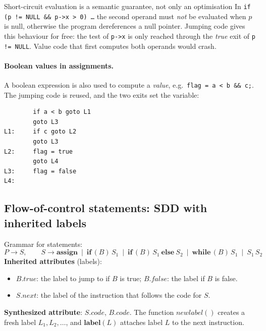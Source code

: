 \documentclass[11pt,a4paper]{article}
\newcommand{\at}[2]{\ensuremath{#1.\mathit{#2}}}
\newcommand{\lbl}[1]{\ensuremath{\mathbf{label}(#1)}}
\begin{document}
\begin{pitfallbox}{Short-circuit evaluation is a semantic guarantee, not only an optimisation}
In \texttt{if (p != NULL \&\& p->x > 0) \dots} the second operand must \emph{not} be evaluated when $p$ is null, otherwise the program dereferences a null pointer. Jumping code gives this behaviour for free: the test of \texttt{p->x} is only reached through the \emph{true} exit of \texttt{p != NULL}. Value code that first computes both operands would crash.
\end{pitfallbox}

\paragraph{Boolean values in assignments.} A boolean expression is also used to compute a \emph{value}, e.g.\ \texttt{flag = a < b \&\& c;}. The jumping code is reused, and the two exits set the variable:
\begin{lstlisting}
        if a < b goto L1
        goto L3
L1:     if c goto L2
        goto L3
L2:     flag = true
        goto L4
L3:     flag = false
L4:
\end{lstlisting}

\subsection{Flow-of-control statements: SDD with inherited labels}
Grammar for statements:
\[
P \to S, \qquad S \to \mathbf{assign}\ \mid\ \mathbf{if}\,(B)\,S_1\ \mid\ \mathbf{if}\,(B)\,S_1\ \mathbf{else}\ S_2\ \mid\ \mathbf{while}\,(B)\,S_1\ \mid\ S_1\,S_2
\]
\textbf{Inherited attributes} (labels):
\begin{itemize}
\item \at{B}{true}: the label to jump to if $B$ is true; \at{B}{false}: the label if $B$ is false.
\item \at{S}{next}: the label of the instruction that follows the code for $S$.
\end{itemize}
\textbf{Synthesized attribute}: \at{S}{code}, \at{B}{code}. The function $\mathit{newlabel}()$ creates a fresh label $L_1, L_2, \dots$, and $\lbl{L}$ attaches label $L$ to the next instruction.
\end{document}
